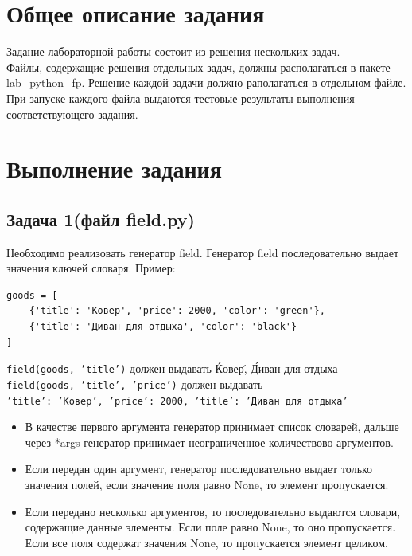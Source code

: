 \documentclass[20pt,a4paper]{report}
\begin{document}
	\chapter{Общее описание задания}
	\large
	\qquad Задание лабораторной работы состоит из решения нескольких задач. \\
	\qquad Файлы, содержащие решения отдельных задач, должны располагаться в пакете lab\_python\_fp. Решение каждой задачи должно раполагаться в отдельном файле. \\
	\qquad При запуске каждого файла выдаются тестовые результаты выполнения соответствующего задания. \\

	\chapter{Выполнение задания}
	\section{Задача 1(файл field.py)}
		\qquad Необходимо реализовать генератор field. Генератор field последовательно выдает значения ключей словаря. Пример: \\
		\small
		\begin{verbatim}
goods = [
	{'title': 'Ковер', 'price': 2000, 'color': 'green'},
    {'title': 'Диван для отдыха', 'color': 'black'}
]
		\end{verbatim}

		\texttt{field(goods, 'title')} \large должен выдавать \'Ковер\', \'Диван для отдыха\' \\

		\small \texttt{field(goods, 'title', 'price')} \large должен выдавать \\ 
		\small \texttt{{'title': 'Ковер', 'price': 2000}, {'title': 'Диван для отдыха'}}
		\large
		\begin{itemize}
			\item В качестве первого аргумента генератор принимает список словарей, дальше через *args генератор принимает неограниченное количествово аргументов. 
			\item Если передан один аргумент, генератор последовательно выдает только значения полей, если значение поля равно None, то элемент пропускается.
			\item Если передано несколько аргументов, то последовательно выдаются словари, содержащие данные элементы. Если поле равно None, то оно пропускается. Если все поля содержат значения None, то пропускается элемент целиком.
		\end{itemize}
\end{document}
